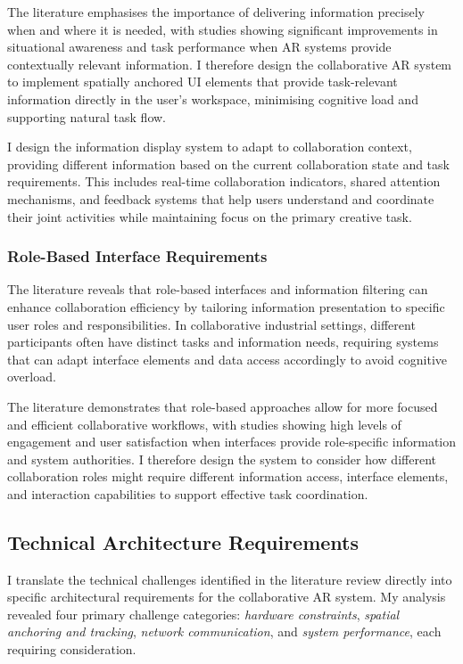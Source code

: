 The literature emphasises the importance of delivering information precisely when and where it is needed, with studies showing significant improvements in situational awareness and task performance when AR systems provide contextually relevant information. I therefore design the collaborative AR system to implement spatially anchored UI elements that provide task-relevant information directly in the user's workspace, minimising cognitive load and supporting natural task flow.

I design the information display system to adapt to collaboration context, providing different information based on the current collaboration state and task requirements. This includes real-time collaboration indicators, shared attention mechanisms, and feedback systems that help users understand and coordinate their joint activities while maintaining focus on the primary creative task.

\subsubsection{Role-Based Interface Requirements}

The literature reveals that role-based interfaces and information filtering can enhance collaboration efficiency by tailoring information presentation to specific user roles and responsibilities. In collaborative industrial settings, different participants often have distinct tasks and information needs, requiring systems that can adapt interface elements and data access accordingly to avoid cognitive overload.

The literature demonstrates that role-based approaches allow for more focused and efficient collaborative workflows, with studies showing high levels of engagement and user satisfaction when interfaces provide role-specific information and system authorities. I therefore design the system to consider how different collaboration roles might require different information access, interface elements, and interaction capabilities to support effective task coordination.

\subsection{Technical Architecture Requirements}
I translate the technical challenges identified in the literature review directly into specific architectural requirements for the collaborative AR system. My analysis revealed four primary challenge categories: \emph{hardware constraints}, \emph{spatial anchoring and tracking}, \emph{network communication}, and \emph{system performance}, each requiring consideration.

